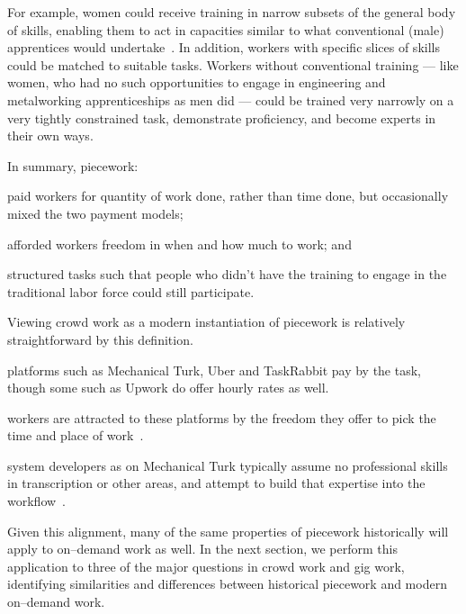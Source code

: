\documentclass[trackingWork]{subfiles}
\begin{document}
For example, women could receive training in narrow subsets of the general body of skills, enabling them to act in capacities similar to what conventional (male) apprentices would undertake~\cite{hart2013rise}.
In addition, workers with specific slices of skills could be matched to suitable tasks.
Workers without conventional training
--- like women, who had no such opportunities
to engage in engineering and metalworking apprenticeships as men did ---
could be trained very narrowly on a very tightly constrained task,
demonstrate proficiency, and become experts in their own ways.

In summary, piecework:
\begin{inlinelist}
  \item paid workers for quantity of work done, rather than time done,
        but occasionally mixed the two payment models;
  \item afforded workers freedom in when and how much to work; and
  \item structured tasks such that people who didn't have the training
        to engage in the traditional labor force could still participate.
\end{inlinelist}

Viewing crowd work as a modern instantiation of piecework is relatively straightforward by this definition.
\begin{Numberlist}
\item platforms such as Mechanical Turk, Uber and TaskRabbit pay by the task, though some such as Upwork do offer hourly rates as well.
\item workers are attracted to these platforms by the freedom they offer to pick the time and place of work~\cite{martin2014being,whyWouldAnyoneBrewer}.
\item system developers as on Mechanical Turk typically assume no professional skills in transcription or other areas, and attempt to build that expertise into the workflow~\cite{noronha2011platemate,bernsteinSoylent}.
\end{Numberlist}
Given this alignment, many of the same properties of piecework historically will apply to on--demand work as well. In the next section, we perform this application to three of the major questions in crowd work and gig work, identifying similarities and differences between historical piecework and modern on--demand work.
\end{document}
